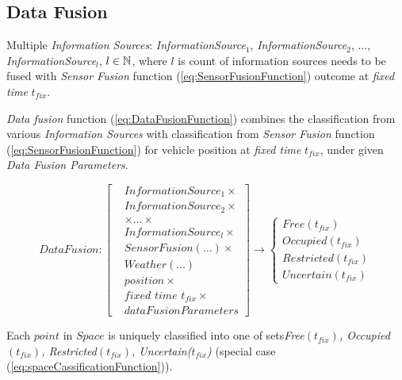 \subsection{Data Fusion}\label{s:dataFusionDefinition}
    \noindent Multiple \emph{Information Sources}: \emph{InformationSource}$_1$, \emph{InformationSource}$_2$, $\dots$, \emph{InformationSource}$_l$, $l\in\mathbb{N}$, where $l$ is count of information sources needs to be fused with \emph{Sensor Fusion} function (\ref{eq:SensorFusionFunction}) outcome at \emph{fixed time} $t_{fix}$.

    \emph{Data fusion} function (\ref{eq:DataFusionFunction}) combines the classification from various \emph{Information Sources} with classification from \emph{Sensor Fusion} function (\ref{eq:SensorFusionFunction}) for vehicle position at \emph{fixed time} $t_{fix}$, under given \emph{Data Fusion Parameters}. 

    \begin{equation}\label{eq:DataFusionFunction}
        DataFusion:
        \left[
        \begin{aligned}
            &InformationSource_1 \times\\
            &InformationSource_2 \times\\
            &\times\dots\times\\
            &InformationSource_l \times\\
            &SensorFusion(\dots)\times\\
            &Weather(\dots)\\
            &position\times\\
            &\textit{fixed time }t_{fix}\times\\
            &dataFusionParameters
        \end{aligned}
        \right]
        \to 
        \begin{cases}
            Free(t_{fix})\\
            Occupied(t_{fix})\\
            Restricted(t_{fix})\\
            Uncertain(t_{fix})
        \end{cases}
    \end{equation}

    Each $point$ in $Space$ is uniquely classified into one of sets\emph{Free$(t_{fix})$, Occupied$(t_{fix})$, Restricted$(t_{fix})$, Uncertain($t_{fix}$)} (special case (\ref{eq:spaceCassificationFunction})).
    
